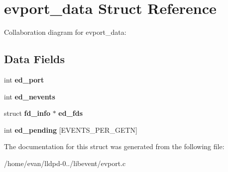 \section{evport\-\_\-data \-Struct \-Reference}
\label{structevport__data}


\-Collaboration diagram for evport\-\_\-data\-:
\subsection*{\-Data \-Fields}
\begin{DoxyCompactItemize}
\item 
int {\bfseries ed\-\_\-port}\label{structevport__data_a827932d3797721654ce382ecf4e5d6a3}

\item 
int {\bfseries ed\-\_\-nevents}\label{structevport__data_ad646e4c2a0925f999b5d7858a0592708}

\item 
struct {\bf fd\-\_\-info} $\ast$ {\bfseries ed\-\_\-fds}\label{structevport__data_ab2023344c8c10cd4fda94cb5b066d9d7}

\item 
int {\bfseries ed\-\_\-pending} [\-E\-V\-E\-N\-T\-S\-\_\-\-P\-E\-R\-\_\-\-G\-E\-T\-N]\label{structevport__data_a32e4acc144177af2a2514a52fb775f43}

\end{DoxyCompactItemize}


\-The documentation for this struct was generated from the following file\-:\begin{DoxyCompactItemize}
\item 
/home/evan/lldpd-\/0../libevent/evport.\-c\end{DoxyCompactItemize}
